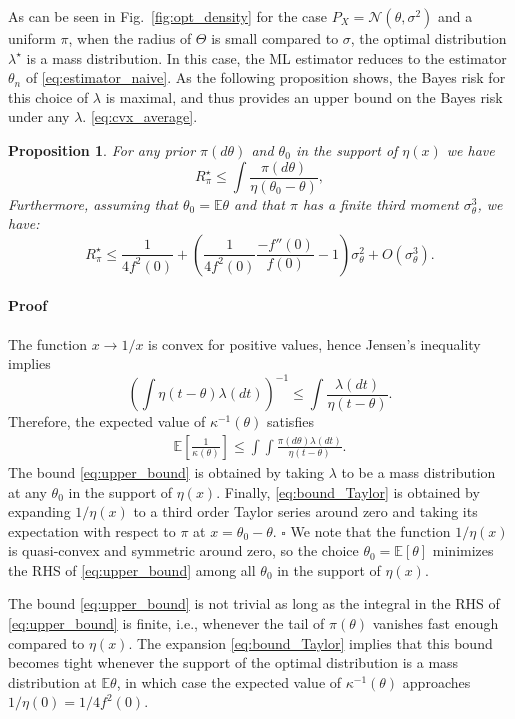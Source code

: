 \documentclass[letterpaper, 11pt]{IEEEtran}      %
\newtheorem{prop}[thm]{\bf {Proposition}}
\newcommand{\ex}[1]{\ensuremath{\mathbb{E}\left[ #1\right]}}
\newenvironment{proof}{\paragraph*{Proof}}{\hfill$\square$ \newline}
\newcommand{\Ncal}{\mathcal{N}}
\begin{document}
As can be seen in Fig.~\ref{fig:opt_density} for the case $P_X = \Ncal(\theta ,\sigma^2)$ and a uniform $\pi$, when the radius of $\Theta$ is small compared to $\sigma$, the optimal distribution $\lambda^\star$ is a mass distribution. In this case, the ML estimator reduces to the estimator ${\theta}_n$ of \eqref{eq:estimator_naive}. As the following proposition shows, the Bayes risk for this choice of $\lambda$ is maximal, and thus provides an upper bound on the Bayes risk under any $\lambda$. 
 \eqref{eq:cvx_average}. 
\begin{prop}\label{prop:upper_bound}
For any prior $\pi(d\theta)$ and $\theta_0$ in the support of $\eta(x)$ we have
\begin{equation} 
\label{eq:upper_bound}
R_\pi^\star  \leq 
 \int \frac{\pi(d\theta)}{\eta \left( \theta_0 - \theta \right)},
\end{equation}
Furthermore, assuming that $\theta_0 = \mathbb E \theta$ and that $\pi$ has a finite third moment $\sigma_\theta^3$, we have: 
\begin{equation}
\label{eq:bound_Taylor}
R^\star_\pi \leq \frac{1}{4 f^2(0)} + \left(\frac{1}{4 f^2(0)} \frac{-f''(0)}{f(0)} -1 \right) \sigma_\theta^2 + O(\sigma_\theta^3).
\end{equation}
\end{prop}
\begin{proof}
The function $x \rightarrow 1/x$ is convex for positive values, hence Jensen's inequality implies
\[
\left( \int \eta \left( t-\theta\right) \lambda(dt) \right)^{-1}  \leq \int  \frac{ \lambda(dt)}{ \eta \left( t-\theta\right)  }. 
\]
Therefore, the expected value of $\kappa^{-1}(\theta)$ satisfies
\begin{align}
\ex{  \frac{1}{\kappa(\theta)}}  \leq \int \int \frac{\pi(d\theta) \lambda(dt) }{\eta \left( t - \theta \right)}. \label{eq:upper_bound_proof}
\end{align}
The bound \eqref{eq:upper_bound} is obtained by taking $\lambda$ to be a mass distribution at any $\theta_0$ in the support of $\eta(x)$. Finally, \eqref{eq:bound_Taylor} is obtained by expanding $1/\eta(x)$ to a third order Taylor series around zero
and taking its expectation with respect to $\pi$ at $x=\theta_0-\theta$. 
\end{proof}
We note that the function $1/\eta(x)$ is quasi-convex and symmetric around zero, so the choice $\theta_0 = \ex{ \theta}$ minimizes the RHS of \eqref{eq:upper_bound} among all $\theta_0$ in the support of $\eta(x)$.\par
The bound \eqref{eq:upper_bound} is not trivial as long as the integral in the RHS of \eqref{eq:upper_bound} is finite, i.e., whenever the tail of $\pi(\theta)$ vanishes fast enough compared to $\eta(x)$. The expansion \eqref{eq:bound_Taylor} implies that this bound becomes tight whenever the support of the optimal distribution is a mass distribution at $\mathbb E \theta$, in which case the expected value of $\kappa^{-1}(\theta)$ approaches $1/\eta(0) = 1/4f^2(0)$. 
\end{document}
